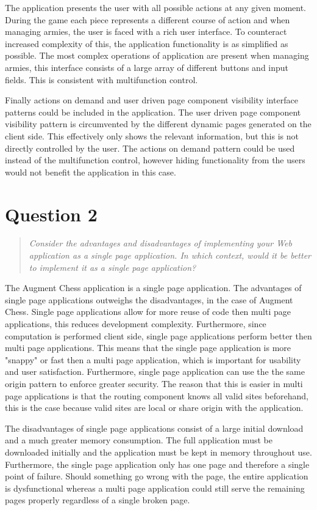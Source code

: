 \documentclass[10pt,a4paper]{report}
\begin{document}
The application presents the user with all possible actions at any given moment. During the game each piece represents a different course of action and when managing armies, the user is faced with a rich user interface. To counteract increased complexity of this, the application functionality is as simplified as possible. The most complex operations of application are present when managing armies, this interface consists of a large array of different buttons and input fields. This is consistent with multifunction control.


Finally actions on demand and user driven page component visibility interface patterns could be included in the application. The user driven page component visibility pattern is circumvented by the different dynamic pages generated on the client side. This effectively only shows the relevant information, but this is not directly controlled by the user. The actions on demand pattern could be used instead of the multifunction control, however hiding functionality from the users would not benefit the application in this case.
\section{Question 2}
\begin{quote}
\textit{Consider the advantages and disadvantages of implementing your Web application as a single page application. In which context, would it be better to implement it as a single page application?}
\end{quote}

The Augment Chess application is a single page application. The advantages of single page applications outweighs the disadvantages, in the case of Augment Chess. Single page applications allow for more reuse of code then multi page applications, this reduces development complexity. Furthermore, since computation is performed client side, single page applications perform better then multi page applications. This means that the single page application is more "snappy" or fast then a multi page application, which is important for usability and user satisfaction. Furthermore, single page application can use the the same origin pattern to enforce greater security. The reason that this is easier in multi page applications is that the routing component knows all valid sites beforehand, this is the case because valid sites are local or share origin with the application.

The disadvantages of single page applications consist of a large initial download and a much greater memory consumption. The full application must be downloaded initially and the application must be kept in memory throughout use. Furthermore, the single page application only has one page and therefore a single point of failure. Should something go wrong with the page, the entire application is dysfunctional whereas a multi page application could still serve the remaining pages properly regardless of a single broken page.
\end{document}
